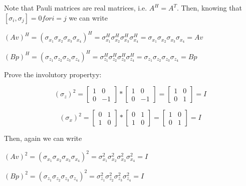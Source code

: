 \documentclass[12pt]{report}
\begin{document}
\begin{minipage}{1\textwidth}
	    Note that Pauli matrices are real matrices, i.e. $A^H=A^T$.
	    Then, knowing that $[\sigma_i,\sigma_j]=0 for i=j$ we can write		\newline
	    
	    \begin{center}
	    $(Av)^{H} = (\sigma_{x_1} \sigma_{x_2} \sigma_{x_3} \sigma_{x_4})^{H} = \sigma_{x_1}^H \sigma_{x_2}^H \sigma_{x_3}^H \sigma_{x_4}^H = \sigma_{x_1} \sigma_{x_2} \sigma_{x_3} \sigma_{x_4} = Av$ \newline
	    
	    $(Bp)^{H} = (\sigma_{z_1} \sigma_{z_2} \sigma_{z_3} \sigma_{z_4})^{H} = \sigma_{z_1}^H \sigma_{z_2}^H \sigma_{z_3}^H \sigma_{z_4}^H = \sigma_{z_1} \sigma_{z_2} \sigma_{z_3} \sigma_{z_4} = Bp$\newline
	    \end{center}
	    
	     Prove the involutory propertyy:\newline
	    
	    \[
	    \text{$( \sigma_z )^{2}$} = 
	    \begin{bmatrix}
	    	1 & 0 \\
	    	0 & -1
	    \end{bmatrix} *
	    \begin{bmatrix}
	    	1 & 0 \\
	    	0 & -1
	    \end{bmatrix} =
	    \begin{bmatrix}
	    	1 & 0 \\
	    	0 & 1
	    \end{bmatrix}
	    = \text{$I$}
	    \]
	    
	    
	    \[
	    \text{$( \sigma_x )^{2}$} = 
	    \begin{bmatrix}
	    	0 & 1 \\
	    	1 & 0
	    \end{bmatrix} *
	    \begin{bmatrix}
	    	0 & 1 \\
	    	1 & 0
	    \end{bmatrix} =
	    \begin{bmatrix}
	    	1 & 0 \\
	    	0 & 1
	    \end{bmatrix}
	    = \text{$I$}
	    \]\newline
	    
	    
	     Then, again we can write\newline
	    
	    \begin{center}
	    $(Av)^{2} = (\sigma_{x_1} \sigma_{x_2} \sigma_{x_3} \sigma_{x_4})^{2} = \sigma_{x_1}^2 \sigma_{x_2}^2 \sigma_{x_3}^2 \sigma_{x_4}^2 = I$ \newline
	    
	    $(Bp)^{2} = (\sigma_{z_1} \sigma_{z_2} \sigma_{z_3} \sigma_{z_4})^{2} = \sigma_{z_1}^2 \sigma_{z_2}^2 \sigma_{z_3}^2 \sigma_{z_4}^2 = I$\newline
     	\end{center}
	    
    \end{minipage}    
    
\end{document}

